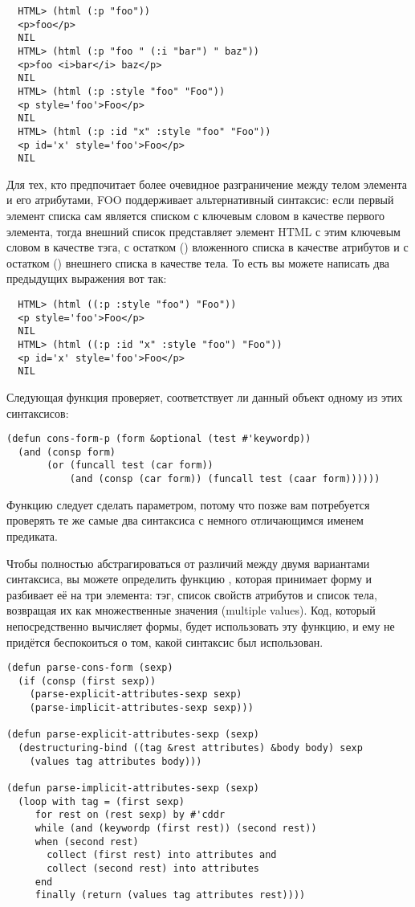 \begin{verbatim}
  HTML> (html (:p "foo"))
  <p>foo</p>
  NIL
  HTML> (html (:p "foo " (:i "bar") " baz"))
  <p>foo <i>bar</i> baz</p>
  NIL
  HTML> (html (:p :style "foo" "Foo"))
  <p style='foo'>Foo</p>
  NIL
  HTML> (html (:p :id "x" :style "foo" "Foo"))
  <p id='x' style='foo'>Foo</p>
  NIL
\end{verbatim}

Для тех, кто предпочитает более очевидное разграничение между телом элемента и его
атрибутами, FOO поддерживает альтернативный синтаксис: если первый элемент списка сам
является списком с ключевым словом в качестве первого элемента, тогда внешний список
представляет элемент HTML с этим ключевым словом в качестве тэга, с остатком ()
вложенного списка в качестве атрибутов и с остатком () внешнего списка в
качестве тела. То есть вы можете написать два предыдущих выражения вот так:

\begin{verbatim}
  HTML> (html ((:p :style "foo") "Foo"))
  <p style='foo'>Foo</p>
  NIL
  HTML> (html ((:p :id "x" :style "foo") "Foo"))
  <p id='x' style='foo'>Foo</p>
  NIL
\end{verbatim}

Следующая функция проверяет, соответствует ли данный объект одному из этих синтаксисов:

\begin{lstlisting}
(defun cons-form-p (form &optional (test #'keywordp))
  (and (consp form)
       (or (funcall test (car form))
           (and (consp (car form)) (funcall test (caar form))))))
\end{lstlisting}

Функцию  следует сделать параметром, потому что позже вам потребуется проверять
те же самые два синтаксиса с немного отличающимся именем предиката.

Чтобы полностью абстрагироваться от различий между двумя вариантами синтаксиса, вы можете
определить функцию , которая принимает форму и разбивает её на три
элемента: тэг, список свойств атрибутов и список тела, возвращая их как множественные
значения (multiple values). Код, который непосредственно вычисляет формы, будет
использовать эту функцию, и ему не придётся беспокоиться о том, какой синтаксис был
использован.

\begin{lstlisting}
(defun parse-cons-form (sexp)
  (if (consp (first sexp))
    (parse-explicit-attributes-sexp sexp)
    (parse-implicit-attributes-sexp sexp)))

(defun parse-explicit-attributes-sexp (sexp)
  (destructuring-bind ((tag &rest attributes) &body body) sexp
    (values tag attributes body)))

(defun parse-implicit-attributes-sexp (sexp)
  (loop with tag = (first sexp)
     for rest on (rest sexp) by #'cddr
     while (and (keywordp (first rest)) (second rest))
     when (second rest)
       collect (first rest) into attributes and
       collect (second rest) into attributes
     end
     finally (return (values tag attributes rest))))
\end{lstlisting}

